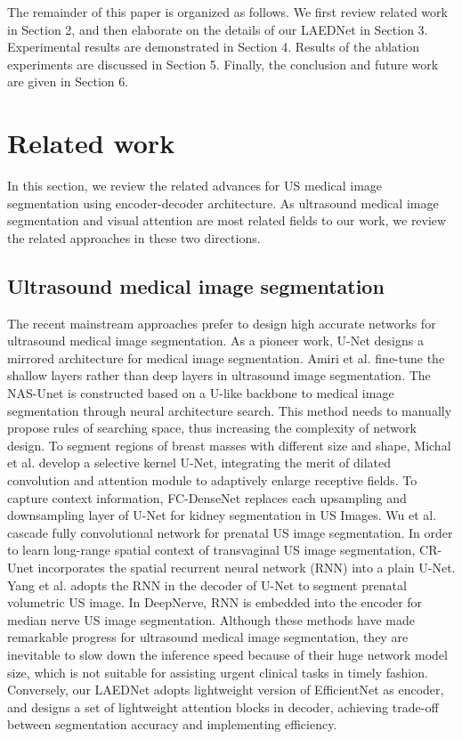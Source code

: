 \documentclass[review]{elsarticle}
\begin{document}
The remainder of this paper is organized as follows. We first review related work in Section 2, and then elaborate on the details of our LAEDNet in Section 3. Experimental results are demonstrated in Section 4. Results of the ablation experiments are discussed in Section 5. Finally, the conclusion and future work are given in Section 6.

\section{Related work}

In this section, we review the related advances for US medical image segmentation using encoder-decoder architecture. As ultrasound medical image segmentation and visual attention are most related fields to our work, we review the related approaches in these two directions.

\subsection{Ultrasound medical image segmentation}

The recent mainstream approaches prefer to design high accurate networks for ultrasound medical image segmentation. As a pioneer work, U-Net\cite{2015U} designs a mirrored architecture for medical image segmentation. Amiri et al. \cite{2020fine-tuning} fine-tune the shallow layers rather than deep layers in ultrasound image segmentation. The NAS-Unet \cite{2019Nas-unet} is constructed based on a U-like backbone \cite{2015U} to medical image segmentation through neural architecture search. This method needs to manually propose rules of searching space, thus increasing the complexity of network design. To segment regions of breast masses with different size and shape, Michal et al.\cite{2020breastmass} develop a selective kernel U-Net, integrating the merit of dilated convolution and attention module to adaptively enlarge receptive fields. To capture context information, FC-DenseNet\cite{wu2019cascaded} replaces each upsampling and downsampling layer of U-Net\cite{2015U} for kidney segmentation in US Images. Wu et al.\cite{wu2017cascaded} cascade fully convolutional network for prenatal US image segmentation. In order to learn long-range spatial context of transvaginal US image segmentation, CR-Unet\cite{li2019cr} incorporates the spatial recurrent neural network (RNN)\cite{hochreiter1997long} into a plain U-Net\cite{2015U}. Yang et al.\cite{yang2018towards} adopts the RNN in the decoder of U-Net\cite{2015U} to segment prenatal volumetric US image. In DeepNerve\cite{horng2020deepnerve}, RNN is embedded into the encoder for median nerve US image segmentation. Although these methods have made remarkable progress for ultrasound medical image segmentation, they are inevitable to slow down the inference speed because of their huge network model size, which is not suitable for assisting urgent clinical tasks in timely fashion. Conversely, our LAEDNet adopts lightweight version of EfficientNet\cite{2019EfficientNet} as encoder, and designs a set of lightweight attention blocks in decoder, achieving trade-off between segmentation accuracy and implementing efficiency.
\end{document}
